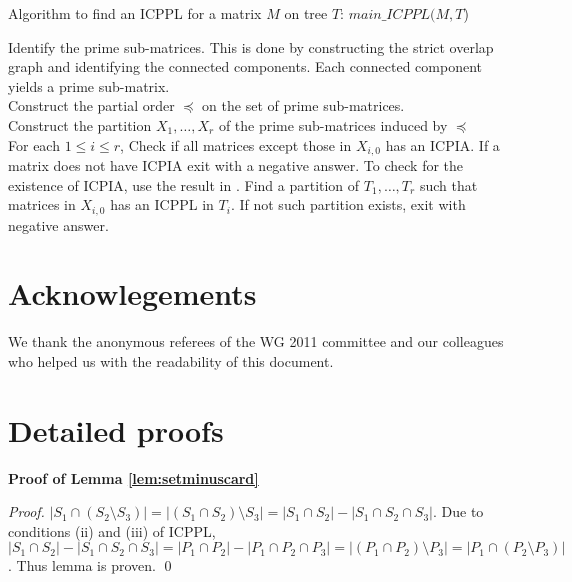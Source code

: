 \documentclass{fsttcs}
\begin{document}
\begin{algorithm}[h]
\caption{Algorithm to find an ICPPL for a matrix $M$ on tree $T$: $main\_ICPPL(M, T$)}
\label{Al:icppa-main}
\begin{algorithmic}
\STATE Identify the prime sub-matrices. This is done by constructing
the strict overlap graph and identifying the connected components. Each
connected component yields a prime sub-matrix.   \\ 
\STATE Construct the partial order $\preccurlyeq$ on the set of prime
sub-matrices.  \\ 
\STATE Construct the partition $X_1,\ldots,X_r$ of the  prime
sub-matrices induced by $\preccurlyeq$ \\
\STATE For each $1 \leq i \leq r$, Check if all matrices except those
in $X_{i,0}$ has an ICPIA.  If a matrix does not have ICPIA exit with
a negative answer.  To check for the existence of ICPIA, use the
result in \cite{nsnrs09}. 
\label{l:icppasubtree} \STATE  Find a partition of $T_1, \ldots, T_r$ such that matrices in
$X_{i,0}$ has an ICPPL in $T_i$.  If not such 
partition exists, exit with negative answer.  
\end{algorithmic}
\end{algorithm}




\section {Acknowlegements} 
We thank the anonymous referees of the WG 2011 committee and our
colleagues who helped us with the readability of this document.


%



\pagebreak
\appendix

\section{Detailed proofs}
{\bf Proof of Lemma \ref{lem:setminuscard}}\\
\begin{proof}
  $|S_1 \cap (S_2 \setminus S_3)| = |(S_1 \cap S_2) \setminus S_3| =
  |S_1 \cap S_2| - |S_1 \cap S_2 \cap S_3|$. Due to conditions (ii)
  and (iii) of ICPPL, $|S_1 \cap S_2| - |S_1 \cap S_2 \cap S_3| = |P_1
  \cap P_2| - |P_1 \cap P_2 \cap P_3| = |(P_1 \cap P_2) \setminus P_3|
  = |P_1 \cap (P_2 \setminus P_3)|$. Thus lemma is proven. \qed
\end{proof}
\end{document}
